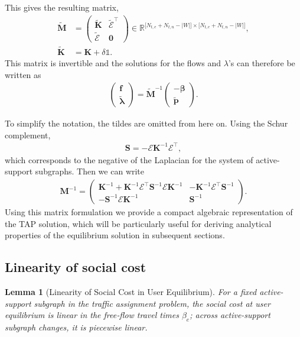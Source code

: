 \documentclass[twocolumn,english,groupedaddress, superscriptaddress,aps,pre,10pt,floatfix]{revtex4-2}
\newtheorem{lemma}{Lemma}
\newcommand{\matr}[1]{{\boldsymbol{#1}}}
\renewcommand{\vec}[1]{{\boldsymbol{#1}}}
\begin{document}
This gives the resulting matrix,
\begin{align}
\tilde{\matr{M}} &=
\begin{pmatrix}
\tilde{\matr{K}} & \tilde{\matr{\mathcal{E}}}^{\!\top}\\
\tilde{\matr{\mathcal{E}}} & \matr{0}
\end{pmatrix}
    \in\mathbb{R}^{\bigl[N_{t,e}+N_{t,n}-|W|\bigr]\times\bigl[N_{t,e}+N_{t,n}-|W|\bigr]},\\
\tilde{\matr{K}} &= \matr{K}+\delta\mathbb{1}.
\end{align}
This matrix is invertible and the solutions for the flows and $\lambda$’s can therefore be written as
\begin{align}\label{eq:flow-solution-mat}
\begin{pmatrix}
\vec{f}\\ \tilde{\boldsymbol{\lambda}}
\end{pmatrix}
= \tilde{\matr{M}}^{-1}
\begin{pmatrix}
-\boldsymbol{\beta}\\ \tilde{\vec{p}}
\end{pmatrix}.
\end{align}

To simplify the notation, the tildes are omitted from here on. 
Using the Schur complement,
\begin{align}\label{eq:schur-complement}
\matr{S}= -\matr{\mathcal{E}}\matr{K}^{-1}\matr{\mathcal{E}}^{\!\top},
\end{align}
which corresponds to the negative of the Laplacian for the system of active-support subgraphs. Then we can write
\begin{align}\label{eq:M-mat}
\matr{M}^{-1}=
\begin{pmatrix}
\matr{K}^{-1}+\matr{K}^{-1}\matr{\mathcal{E}}^{\!\top}\matr{S}^{-1}\matr{\mathcal{E}}\matr{K}^{-1}
    & -\matr{K}^{-1}\matr{\mathcal{E}}^{\!\top}\matr{S}^{-1}\\[4pt]
-\matr{S}^{-1}\matr{\mathcal{E}}\matr{K}^{-1}
    & \matr{S}^{-1}
\end{pmatrix}.
\end{align}
Using this matrix formulation we provide a compact algebraic representation of the TAP solution, which will be particularly useful for deriving analytical properties of the equilibrium solution in subsequent sections.

\subsection{Linearity of social cost}
\begin{lemma}[Linearity of Social Cost in User Equilibrium]\label{lemma:linear}
For a fixed active-support subgraph in the traffic assignment problem, the social cost at user equilibrium is linear in the free‑flow travel times $\beta_e$; across active-support subgraph changes, it is piecewise linear.
\end{lemma}
\end{document}
